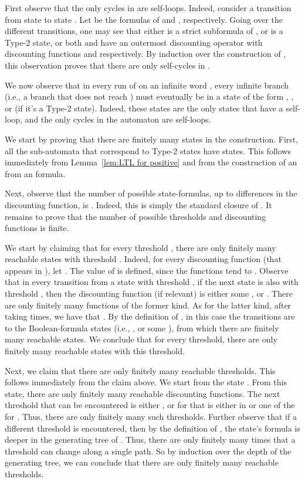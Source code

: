 \documentclass{llncs}
\begin{document}
First observe that the only cycles in  are self-loops. Indeed, consider a transition from state  to state . Let  be the formulas of  and , respectively.
Going over the different transitions, one may see that either  is a strict subformula of , or  is a Type-2 state, or both  and  have an outermost discounting operator with discounting functions  and  respectively. By induction over the construction of , this observation proves that there are only self-cycles in .

We now observe that in every run of  on an infinite word , every infinite branch (i.e., a branch that does not reach ) must eventually be in a state of the form , ,  or  (if it's a Type-2 state). Indeed, these states are the only states that have a self-loop, and the only cycles in the automaton are self-loops.

We start by proving that there are finitely many states in the construction. First, all the sub-automata that correspond to Type-2 states have  states. This follows immediately from Lemma~\ref{lem:LTL for positive} and from the construction of an  from an  formula.

Next, observe that the number of possible state-formulas, up to differences in the discounting function, is . Indeed, this is simply the standard closure of . It remains to prove that the number of possible thresholds and discounting functions is finite.

We start by claiming that for every threshold , there are only finitely many reachable states with threshold . Indeed, for every discounting function  (that appears in ), let . The value of  is defined, since the functions tend to . Observe that in every transition from a state with threshold , if the next state is also with threshold , then the discounting function (if relevant) is either some , or . There are only finitely many functions of the former kind. As for the latter kind, after taking   times, we have that . By the definition of , in this case the transitions are to the Boolean-formula states (i.e., , or some ), from which there are finitely many reachable states. We conclude that for every threshold, there are only finitely many reachable states with this threshold.

Next, we claim that there are only finitely many reachable thresholds. This follows immediately from the claim above. We start from the state . From this state, there are only finitely many reachable discounting functions. The next threshold that can be encountered is either , or  for  that is either in  or one of the  for . Thus, there are only finitely many such thresholds. Further observe that if a different threshold is encountered, then by the definition of , the state's formula is deeper in the generating tree of . Thus, there are only finitely many times that a threshold can change along a single path. So by induction over the depth of the generating tree, we can conclude that there are only finitely many reachable thresholds.
\end{document}
